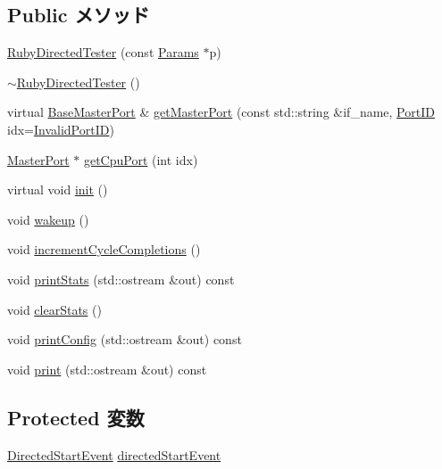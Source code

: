 \subsection*{Public メソッド}
\begin{DoxyCompactItemize}
\item 
\hyperlink{classRubyDirectedTester_af56e86da68a0ae2168e4a4da7db4d3dd}{RubyDirectedTester} (const \hyperlink{classRubyDirectedTester_af24daccceb54fc519ecd978200efef2d}{Params} $\ast$p)
\item 
\hyperlink{classRubyDirectedTester_acdd0dcac0bc534b5d325cf0f16cf7d33}{$\sim$RubyDirectedTester} ()
\item 
virtual \hyperlink{classBaseMasterPort}{BaseMasterPort} \& \hyperlink{classRubyDirectedTester_adc4e675e51defbdd1e354dac729d0703}{getMasterPort} (const std::string \&if\_\-name, \hyperlink{base_2types_8hh_acef4d7d41cb21fdc252e20c04cd7bb8e}{PortID} idx=\hyperlink{base_2types_8hh_a65bf40f138cf863f0c5e2d8ca1144126}{InvalidPortID})
\item 
\hyperlink{classMasterPort}{MasterPort} $\ast$ \hyperlink{classRubyDirectedTester_afb2179270e6e95e49bca0e058322dcfe}{getCpuPort} (int idx)
\item 
virtual void \hyperlink{classRubyDirectedTester_a02fd73d861ef2e4aabb38c0c9ff82947}{init} ()
\item 
void \hyperlink{classRubyDirectedTester_ae674290a26ecbd622c5160e38e8a4fe9}{wakeup} ()
\item 
void \hyperlink{classRubyDirectedTester_a54b25b6592260a8ab819b318e46213b9}{incrementCycleCompletions} ()
\item 
void \hyperlink{classRubyDirectedTester_a38f932a0a623730fe10783f46d243cef}{printStats} (std::ostream \&out) const 
\item 
void \hyperlink{classRubyDirectedTester_ac7ec7476159db4e2bb0372e30010fc9e}{clearStats} ()
\item 
void \hyperlink{classRubyDirectedTester_a773d0e977425600264039f8941f18496}{printConfig} (std::ostream \&out) const 
\item 
void \hyperlink{classRubyDirectedTester_ac55fe386a101fbae38c716067c9966a0}{print} (std::ostream \&out) const 
\end{DoxyCompactItemize}
\subsection*{Protected 変数}
\begin{DoxyCompactItemize}
\item 
\hyperlink{classRubyDirectedTester_1_1DirectedStartEvent}{DirectedStartEvent} \hyperlink{classRubyDirectedTester_a6dcecbde02795db3382deedbc3b3b6bd}{directedStartEvent}
\end{DoxyCompactItemize}
